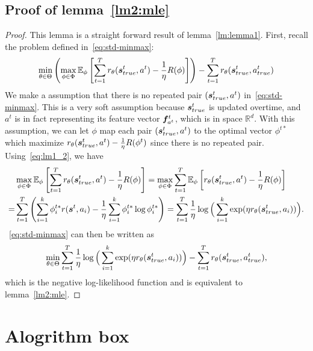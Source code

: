 \documentclass{article} %
\begin{document}
\subsection{Proof of lemma~\ref{lm2:mle}} 
\secondlemma*
\begin{proof}This lemma is a straight forward result of lemma~\ref{lm:lemma1}.
First, recall the problem defined in~\eqref{eq:std-minmax}:
\[
\min_{\theta \in \Theta} \left(\max_{\phi\in \Phi}  \mathbb{E}_{\phi} \left[\sum_{t=1}^Tr_{\theta}({\bm{s}}^t_{true}, a^t) -\frac{1}{\eta}R(\phi)\right]\right)-\sum_{t=1}^T r_{\theta}({\bm{s}}^t_{true}, a^t_{true})
	\]
We make a assumption that there is no repeated pair $({\bm{s}}^t_{true}, a^t)$ in~\eqref{eq:std-minmax}. This is a very soft assumption because ${\bm{s}}^t_{true}$ is updated overtime, and $a^t$ is in fact representing its feature vector ${\bm{f}}^t_{a^t}$, which is in space $\mathbb{R}^d$. With this assumption, we can let $\phi$ map each pair $({\bm{s}}^t_{true}, a^t)$ to the optimal vector $\phi^{t*}$  which maximize $r_{\theta}({\bm{s}}^t_{true}, a^t) -\frac{1}{\eta}R(\phi^t)$ since there is no repeated pair. Using~\eqref{eq:lm1_2}, we have
\begin{align*}
&\max_{\phi\in \Phi}  \mathbb{E}_{\phi} \left[\sum_{t=1}^Tr_{\theta}({\bm{s}}^t_{true}, a^t) -\frac{1}{\eta}R(\phi)\right] = \max_{\phi\in \Phi} \sum_{t=1}^T \mathbb{E}_{\phi} \left[r_{\theta}({\bm{s}}^t_{true}, a^t) -\frac{1}{\eta}R(\phi)\right] \\
    =& \sum_{t=1}^T\left(   \sum_{i=1}^k \phi_i^{t*}r({\bm{s}}^t, a_i) -\frac{1}{\eta} \sum_{i=1}^k \phi_i^{t*} \log \phi_i^{t*} \right)=\sum_{t=1}^T\frac{1}{\eta}\log\Big(\sum_{i=1}^k \exp(\eta r_{\theta}({\bm{s}}^t_{true}, a_i))\Big).
\end{align*}~\eqref{eq:std-minmax} can then be written as
\[
\min_{\theta\in\Theta}\sum_{t=1}^T\frac{1}{\eta}\log\Big(\sum_{i=1}^k \exp(\eta r_{\theta}({\bm{s}}^t_{true}, a_i))\Big) - \sum_{t=1}^T r_{\theta}({\bm{s}}^t_{true}, a^t_{true}),
\]
which is the negative log-likelihood function and is equivalent to lemma~\ref{lm2:mle}.
\end{proof}

\section{Alogrithm box}\label{app:algo}
\end{document}

